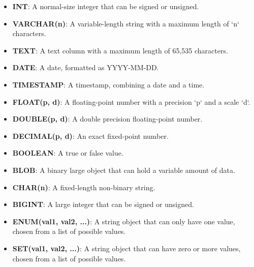 \begin{itemize}[noitemsep,leftmargin=*]
\leftskip-\dimexpr\leftmargin %
    \item[]{\textbf{INT}: A normal-size integer that can be signed or unsigned.}
    \item[]{\textbf{VARCHAR(n)}: A variable-length string with a maximum length of `n` characters.}
    \item[]{\textbf{TEXT}: A text column with a maximum length of 65,535 characters.}
    \item[]{\textbf{DATE}: A date, formatted as YYYY-MM-DD.}
    \item[]{\textbf{TIMESTAMP}: A timestamp, combining a date and a time.}
    \item[]{\textbf{FLOAT(p, d)}: A floating-point number with a precision `p` and a scale `d`.}
    \item[]{\textbf{DOUBLE(p, d)}: A double precision floating-point number.}
    \item[]{\textbf{DECIMAL(p, d)}: An exact fixed-point number.}
    \item[]{\textbf{BOOLEAN}: A true or false value.}
    \item[]{\textbf{BLOB}: A binary large object that can hold a variable amount of data.}
    \item[]{\textbf{CHAR(n)}: A fixed-length non-binary string.}
    \item[]{\textbf{BIGINT}: A large integer that can be signed or unsigned.}
    \item[]{\textbf{ENUM(val1, val2, ...)}: A string object that can only have one value, chosen from a list of possible values.}
    \item[]{\textbf{SET(val1, val2, ...)}: A string object that can have zero or more values, chosen from a list of possible values.}
\end{itemize}

